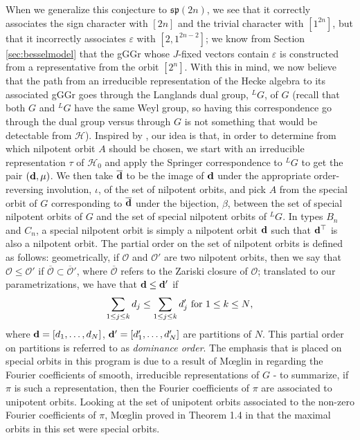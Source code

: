 \documentclass[11pt,letterpaper]{article}
\newcommand{\calH}{\mathcal{H}} %
\newcommand{\calO}{\mathcal{O}} %
\newcommand{\ve}{\varepsilon}
\newcommand{\goth}{\mathfrak}
\renewcommand{\sp}{\goth{sp}}
\theoremstyle{remark}
\numberwithin{equation}{section}
\begin{document}
When we generalize this conjecture to $\sp(2n)$, we see that it correctly associates the sign character with $[2n]$ and the trivial character with $[1^{2n}]$, but that it incorrectly associates $\ve$ with $[2,1^{2n-2}]$; we know from Section \ref{sec:besselmodel} that the gGGr whose $J$-fixed vectors contain $\ve$ is constructed from a representative from the orbit $[2^n]$. With this in mind, we now believe that the path from an irreducible representation of the Hecke algebra to its associated gGGr goes through the Langlands dual group, $^LG$, of $G$ (recall that both $G$ and $^LG$ have the same Weyl group, so having this correspondence go through the dual group versus through $G$ is not something that would be detectable from $\calH$). Inspired by \cite{Ginz}, our idea is that, in order to determine from which nilpotent orbit $A$ should be chosen, we start with an irreducible representation $\tau$ of $\calH_0$ and apply the Springer correspondence to $^LG$ to get the pair $({\bf d}, \mu)$. We then take $\overline{\bf d}$ to be the image of ${\bf d}$ under the appropriate order-reversing involution, $\iota$, of the set of nilpotent orbits, and pick $A$ from the special orbit of $G$ corresponding to $\overline{\bf d}$ under the bijection, $\beta$, between the set of special nilpotent orbits of $G$ and the set of special nilpotent orbits of $^LG$. In types $B_n$ and $C_n$, a special nilpotent orbit is simply a nilpotent orbit ${\bf d}$ such that ${\bf d}^{\top}$ is also a nilpotent orbit. The partial order on the set of nilpotent orbits is defined as follows: geometrically, if $\calO$ and $\calO'$ are two nilpotent orbits, then we say that $\calO \leq \calO'$ if $\overline{\calO} \subset \overline{\calO}'$, where $\overline{\calO}$ refers to the Zariski closure of $\calO$; translated to our parametrizations, we have that ${\bf d} \leq {\bf d}'$ if $$\sum_{1 \leq j \leq k} d_j \leq \sum_{1 \leq j \leq k} d_j' \textup{ for $1 \leq k \leq N$},$$ where ${\bf d} = [d_1,\hdots, d_N]$, ${\bf d}' = [d_1',\hdots, d_N']$ are partitions of $N$. This partial order on partitions is referred to as \emph{dominance order}. The emphasis that is placed on special orbits in this program is due to a result of M\oe glin in \cite{Moeg} regarding the Fourier coefficients of smooth, irreducible representations of $G$ - to summarize, if $\pi$ is such a representation, then the Fourier coefficients of $\pi$ are associated to unipotent orbits. Looking at the set of unipotent orbits associated to the non-zero Fourier coefficients of $\pi$, M\oe glin proved in Theorem 1.4 in \cite{Moeg} that the maximal orbits in this set were special orbits.
\end{document}
